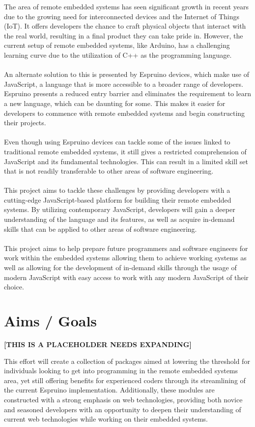 \documentclass{l4proj}
\begin{document}
\text 
The area of remote embedded systems has seen significant growth in recent years due to the growing need for interconnected devices and the Internet of Things (IoT). It offers developers the chance to craft physical objects that interact with the real world, resulting in a final product they can take pride in. However, the current setup of remote embedded systems, like Arduino, has a challenging learning curve due to the utilization of C++ as the programming language.
\\ \\
An alternate solution to this is presented by Espruino devices, which make use of JavaScript, a language that is more accessible to a broader range of developers. Espruino presents a reduced entry barrier and eliminates the requirement to learn a new language, which can be daunting for some. This makes it easier for developers to commence with remote embedded systems and begin constructing their projects.
\\ \\
Even though using Espruino devices can tackle some of the issues linked to traditional remote embedded systems, it still gives a restricted comprehension of JavaScript and its fundamental technologies. This can result in a limited skill set that is not readily transferable to other areas of software engineering.
\\ \\
This project aims to tackle these challenges by providing developers with a cutting-edge JavaScript-based platform for building their remote embedded systems. By utilizing contemporary JavaScript, developers will gain a deeper understanding of the language and its features, as well as acquire in-demand skills that can be applied to other areas of software engineering.
\\ \\
This project aims to help prepare future programmers and software engineers for work within the embedded systems allowing them to achieve working systems as well as allowing for the development of in-demand skills through the usage of modern JavaScript with easy access to work with any modern JavaScript of their choice.

\section{Aims / Goals}

\textbf{[THIS IS A PLACEHOLDER NEEDS EXPANDING]}

\text This effort will create a collection of packages aimed at lowering the threshold for individuals looking to get into programming in the remote embedded systems area, yet still offering benefits for experienced coders through its streamlining of the current Espruino implementation. Additionally, these modules are constructed with a strong emphasis on web technologies, providing both novice and seasoned developers with an opportunity to deepen their understanding of current web technologies while working on their embedded systems.
\end{document}
